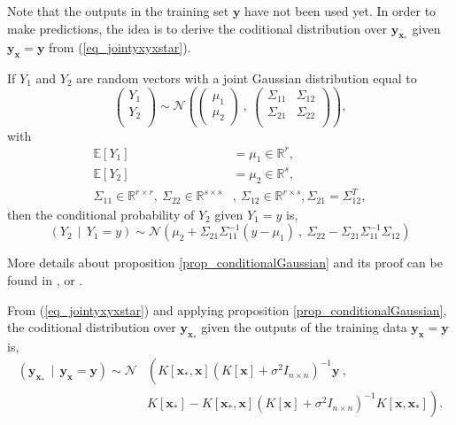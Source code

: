 Note that the outputs in the training set $\pmb{y}$ have not been used yet. In order to make predictions, the idea is to derive the coditional distribution over $\pmb{y_{x_*}}$ given $\pmb{y_{x}} = \pmb{y}$ from (\ref{eq_jointyxyxstar}).

\begin{proposition} \label{prop_conditionalGaussian}
  If $Y_1$ and $Y_2$ are random vectors with a joint Gaussian distribution equal to
  $$
    \begin{pmatrix} Y_1 \\ Y_2 \\ \end{pmatrix} \sim
    \mathcal{N} \left(
           \begin{pmatrix} \mu_1 \\ \mu_2 \end{pmatrix} \ , \ 
           \begin{pmatrix}
             \Sigma_{11}   & \Sigma_{12} \\ 
             \Sigma_{21} & \Sigma_{22} \\
           \end{pmatrix}
           \right),
  $$
  with
  $$
   \begin{aligned}
    \mathbb{E}[Y_1] &= \mu_1 \in \mathbb{R}^r, \\
    \mathbb{E}[Y_2] &= \mu_2 \in \mathbb{R}^s, \\
    \Sigma_{11} \in \mathbb{R}^{r \times r}, \ \Sigma_{22} \in \mathbb{R}^{s \times s}&, \ \Sigma_{12} \in \mathbb{R}^{r \times s}, \Sigma_{21} = \Sigma_{12}^T, %
   \end{aligned}
  $$ 
  then the conditional probability of $Y_2$ given $Y_1 = y$ is,
  $$
    \left( Y_2 \ \ | \ \ Y_1 = y \right) \sim
    \mathcal{N} \left(
           \mu_2 + \Sigma_{21} \Sigma_{11}^{-1} (y-\mu_1) \ , \
           \Sigma_{22} - \Sigma_{21} \Sigma_{11}^{-1} \Sigma_{12} 
           \right)
  $$
\end{proposition}

More details about proposition \ref{prop_conditionalGaussian} and its proof can be found in \textcite{anderson2003}, \textcite{mises1964} or \textcite{rasmussen2006}.

From (\ref{eq_jointyxyxstar}) and applying proposition \ref{prop_conditionalGaussian}, the coditional distribution over $\pmb{y_{x_*}}$ given the outputs of the training data $\pmb{y_{x}} = \pmb{y}$ is,
\begin{equation} \label{eq_GPconditionalForRegression}
  \begin{aligned}
    \left( \pmb{y_{x_*}} \ \ | \ \ \pmb{y_{x}} = \pmb{y} \right) \sim
    \mathcal{N} &\left(
           K[\pmb{x_*},\pmb{x}] 
           \left( 
             K[\pmb{x}] + \sigma^2 I_{n \times n} 
           \right)^{-1} 
           \pmb{y} \ , \right. \\
           &\left.
           K[\pmb{x_*}] - K[\pmb{x_*},\pmb{x}] 
           \left( 
             K[\pmb{x}] + \sigma^2 I_{n \times n} 
           \right)^{-1} 
           K[\pmb{x},\pmb{x_*}]
           \right).
  \end{aligned} 
\end{equation} 

